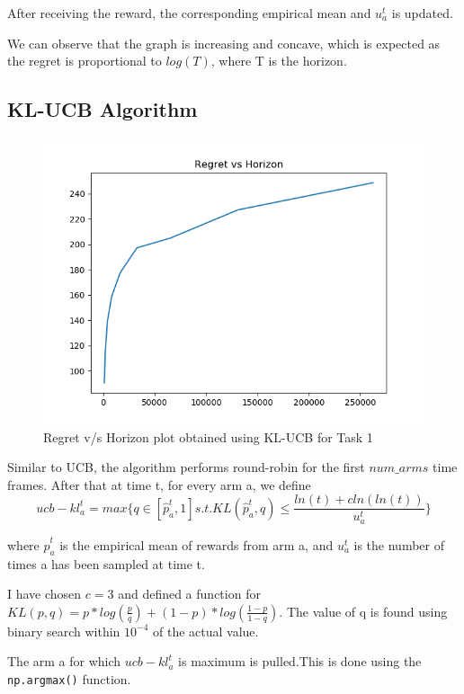 \documentclass{article}
\begin{document}
After receiving the reward, the corresponding empirical mean and $u_{a}^{t}$ is updated.

We can observe that the graph is increasing and concave, which is expected as the 
regret is proportional to $log(T)$, where T is the horizon.

\newpage
\thispagestyle{fancy}
\subsection{KL-UCB Algorithm}
\begin{figure}[H]
    \centerline{\includegraphics[scale=0.75]{task1-KL_UCB-20220831-171556.png}}
    \caption{Regret v/s Horizon plot obtained using KL-UCB for Task 1}
\end{figure}


Similar to UCB, the algorithm performs round-robin for the first $num\_arms$ time frames. 
After that at time t, for every arm a, we define 
\[ ucb-kl_{a}^{t} = max\{q \in [\hat{p}^{t}_{a},1] s.t. KL(\hat{p}^{t}_{a},q) \le \frac{ln(t) + cln(ln(t))}{u_{a}^{t}} \}\]

where $\hat{p}^{t}_{a}$ is the empirical mean of rewards from arm a, and
$u_{a}^{t}$ is the number of times a has been sampled at time t. 
 
I have chosen $c = 3$ and defined a function for $KL(p,q) = p*log(\frac{p}{q}) + (1-p)*log(\frac{1-p}{1-q})$.
The value of q is found using binary search within $10^{-4}$ of the actual value.

The arm a for which $ucb-kl_{a}^{t}$ is maximum is pulled.This is done using the \verb!np.argmax()! function.
\end{document}
